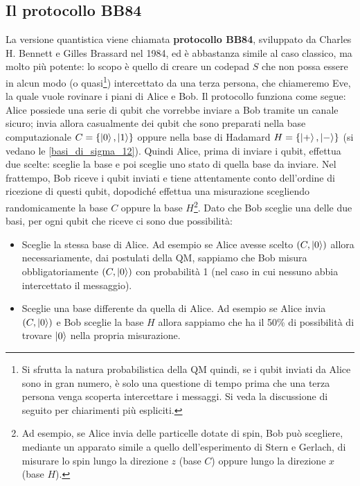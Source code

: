 \subsection{Il protocollo BB84}
La versione quantistica viene chiamata \textbf{protocollo BB84}, sviluppato da Charles H. Bennett e Gilles Brassard nel 1984, ed è abbastanza simile al caso classico, ma molto più potente: lo scopo è quello di creare un codepad $S$ che non possa essere in alcun modo (o quasi\footnote{Si sfrutta la natura probabilistica della QM quindi, se i qubit inviati da Alice sono in gran numero, è solo una questione di tempo prima che una terza persona venga scoperta intercettare i messaggi. Si veda la discussione di seguito per chiarimenti più espliciti.}) intercettato da una terza persona, che chiameremo Eve, la quale vuole rovinare i piani di Alice e Bob. Il protocollo funziona come segue: Alice possiede una serie di qubit che vorrebbe inviare a Bob tramite un canale sicuro; invia allora casualmente dei qubit che sono preparati nella base computazionale $C = \{ \ket{0}, \ket{1} \}$ oppure nella base di Hadamard $H = \{ \ket{+}, \ket{-} \}$ (si vedano le \eqref{basi_di_sigma_12}). Quindi Alice, prima di inviare i qubit, effettua due scelte: sceglie la base e poi sceglie uno stato di quella base da inviare. Nel frattempo, Bob riceve i qubit inviati e tiene attentamente conto dell'ordine di ricezione di questi qubit, dopodiché effettua una misurazione scegliendo randomicamente la base $C$ oppure la base $H$\footnote{Ad esempio, se Alice invia delle particelle dotate di spin, Bob può scegliere, mediante un apparato simile a quello dell'esperimento di Stern e Gerlach, di misurare lo spin lungo la direzione $z$ (base $C$) oppure lungo la direzione $x$ (base $H$).}. Dato che Bob sceglie una delle due basi, per ogni qubit che riceve ci sono due possibilità:
\begin{itemize}
    \item Sceglie la stessa base di Alice. Ad esempio se Alice avesse scelto $(C, \ket{0})$ allora necessariamente, dai postulati della QM, sappiamo che Bob misura obbligatoriamente $(C, \ket{0})$ con probabilità 1 (nel caso in cui nessuno abbia intercettato il messaggio).
    
    \item Sceglie una base differente da quella di Alice. Ad esempio se Alice invia $(C, \ket{0})$ e Bob sceglie la base $H$ allora sappiamo che ha il 50\% di possibilità di trovare $\ket{0}$ nella propria misurazione. 
\end{itemize}

